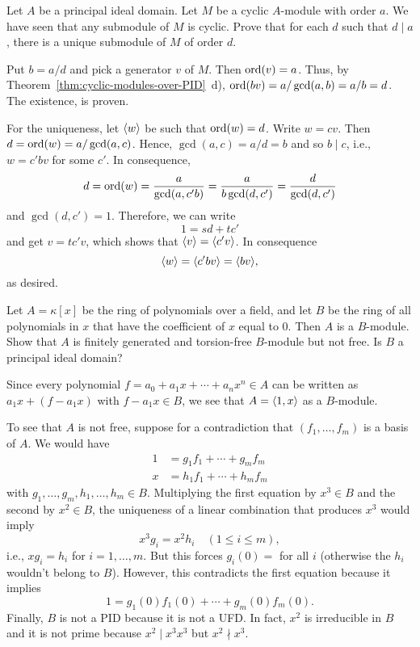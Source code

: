 \begin{exr}
    Let\/ $A$ be a principal ideal domain. Let\/ $M$ be a cyclic $A$-module with order\/ $a$. We have seen that any submodule of\/ $M$ is cyclic. Prove that for each\/ $d$ such that\/ $d \mid a$, there is a unique submodule of\/ $M$ of order\/ $d$.
\end{exr}

\begin{solution}
    Put $b=a/d$ and pick a generator $v$ of $M$. Then $\operatorname{ord}(v)=a$. Thus, by Theorem~\ref{thm:cyclic-modules-over-PID}~d), $\operatorname{ord}(bv)=a/\gcd(a,b)=a/b=d$. The existence, is proven.

    For the uniqueness, let $\langle w\rangle$ be such that $\operatorname{ord}(w)=d$. Write $w=cv$. Then $d=\operatorname{ord}(w)=a/\gcd(a,c)$.
    Hence, $\gcd(a,c)=a/d=b$ and so $b\mid c$, i.e., $w=c'bv$ for some $c'$. In consequence,
    $$
        d=\operatorname{ord}(w)=\frac a{\gcd(a,c'b)}
            =\frac a{b\gcd(d,c')} = \frac d{\gcd(d,c')}
    $$
    and $\gcd(d,c')=1$. Therefore, we can write
    $$
        1 = sd + tc'
    $$
    and get $v=tc'v$, which shows that $\langle v\rangle=\langle c'v\rangle$. In consequence
    $$
        \langle w\rangle=\langle c'bv\rangle=\langle bv\rangle,
    $$
    as desired.
\end{solution}

\begin{exr}
    Let\/ $A=\kappa[x]$ be the ring of polynomials over a field, and let\/ $B$ be the ring of all polynomials in\/ $x$ that have the coefficient of\/ $x$ equal to\/ $0$. Then\/ $A$ is a\/ $B$-module. Show that\/ $A$ is finitely generated and torsion-free\/ $B$-module but not free. Is\/ $B$ a principal ideal domain?
\end{exr}

\begin{solution}
    Since every polynomial $f=a_0+a_1x+\cdots+a_nx^n\in A$ can be written as $a_1x+(f-a_1x)$ with $f-a_1x\in B$, we see that $A=\langle1,x\rangle$ as a $B$-module.

    To see that $A$ is not free, suppose for a contradiction that $(f_1,\dots,f_m)$ is a basis of $A$. We would have
    \begin{align*}
        1 &= g_1f_1+\cdots+g_mf_m\\
        x &= h_1f_1+\cdots+h_mf_m
    \end{align*}
    with $g_1,\dots,g_m,h_1,\dots,h_m\in B$. Multiplying the first equation by $x^3\in B$ and the second by $x^2\in B$, the uniqueness of a linear combination that produces $x^3$ would imply
    $$
        x^3g_i=x^2h_i\quad(1\le i\le m),
    $$
    i.e., $xg_i=h_i$ for $i=1,\dots,m$. But this forces $g_i(0)=$ for all $i$ (otherwise the $h_i$ wouldn't belong to $B$). However, this contradicts the first equation because it implies
    $$
        1 = g_1(0)f_1(0)+\cdots+g_m(0)f_m(0).
    $$
    Finally, $B$ is not a PID because it is not a UFD. In fact, $x^2$ is irreducible in $B$ and it is not prime because $x^2\mid x^3x^3$ but $x^2\nmid x^3$.
\end{solution}


